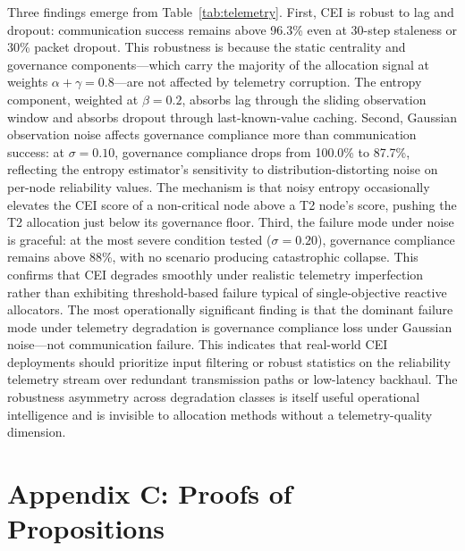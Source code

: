 \documentclass[runningheads]{llncs}
\begin{document}
Three findings emerge from Table~\ref{tab:telemetry}. First, CEI is robust to lag and dropout: communication success remains above 96.3\% even at 30-step staleness or 30\% packet dropout. This robustness is because the static centrality and governance components---which carry the majority of the allocation signal at weights $\alpha + \gamma = 0.8$---are not affected by telemetry corruption. The entropy component, weighted at $\beta = 0.2$, absorbs lag through the sliding observation window and absorbs dropout through last-known-value caching. Second, Gaussian observation noise affects governance compliance more than communication success: at $\sigma = 0.10$, governance compliance drops from 100.0\% to 87.7\%, reflecting the entropy estimator's sensitivity to distribution-distorting noise on per-node reliability values. The mechanism is that noisy entropy occasionally elevates the CEI score of a non-critical node above a T2 node's score, pushing the T2 allocation just below its governance floor. Third, the failure mode under noise is graceful: at the most severe condition tested ($\sigma = 0.20$), governance compliance remains above 88\%, with no scenario producing catastrophic collapse. This confirms that CEI degrades smoothly under realistic telemetry imperfection rather than exhibiting threshold-based failure typical of single-objective reactive allocators. The most operationally significant finding is that the dominant failure mode under telemetry degradation is governance compliance loss under Gaussian noise---not communication failure. This indicates that real-world CEI deployments should prioritize input filtering or robust statistics on the reliability telemetry stream over redundant transmission paths or low-latency backhaul. The robustness asymmetry across degradation classes is itself useful operational intelligence and is invisible to allocation methods without a telemetry-quality dimension.

\section*{Appendix C: Proofs of Propositions}
\label{app:proofs}
\end{document}
